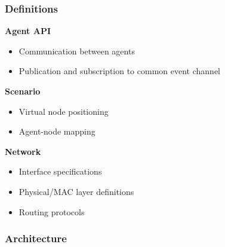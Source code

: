 \documentclass[mathserif]{beamer}
\begin{document}
\frame
{
    \frametitle{Definitions}
    \textbf{Agent API}
    \begin{itemize}
        \item Communication between agents
        \item Publication and subscription to common event channel
    \end{itemize}

    \textbf{Scenario}
    \begin{itemize}
        \item Virtual node positioning
        \item Agent-node mapping
    \end{itemize}

    \textbf{Network}
    \begin{itemize}
        \item Interface specifications
        \item Physical/MAC layer definitions
        \item Routing protocols
    \end{itemize}
}

\frame
{
    \frametitle{Architecture}
}
\end{document}
